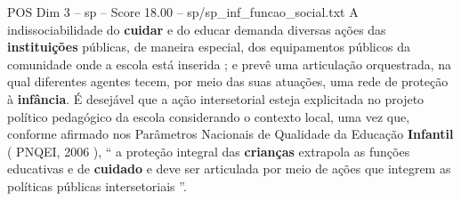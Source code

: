 \begin{textsample}{POS Dim 3 – sp – Score 18.00 – sp/sp\_inf\_funcao\_social.txt}
A indissociabilidade do \textbf{cuidar} e do educar demanda diversas ações das \textbf{instituições} públicas, de maneira especial, dos equipamentos públicos da comunidade onde a escola está inserida ; e prevê uma articulação orquestrada, na qual diferentes agentes tecem, por meio das suas atuações, uma rede de proteção à \textbf{infância}.
É desejável que a ação intersetorial esteja explicitada no projeto político pedagógico da escola considerando o contexto local, uma vez que, conforme afirmado nos Parâmetros Nacionais de Qualidade da Educação \textbf{Infantil} ( PNQEI, 2006 ), “ a proteção integral das \textbf{crianças} extrapola as funções educativas e de \textbf{cuidado} e deve ser articulada por meio de ações que integrem as políticas públicas intersetoriais ”.

\end{textsample}
